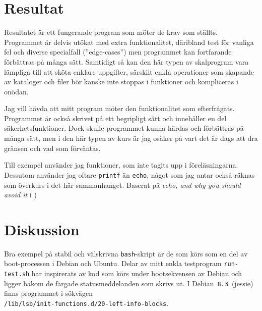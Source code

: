 %
%
%


\section{Resultat}
Resultatet är ett fungerande program som möter de krav som ställts.
Programmet är delvis utökat med extra funktionalitet, däribland test för vanliga
fel och diverse specialfall (''edge-cases'') men programmet kan fortfarande 
förbättras på många sätt. Samtidigt så kan den här typen av skalprogram vara
lämpliga till att sköta enklare uppgifter, särskilt enkla operationer som 
skapande av kataloger och filer bör kanske inte stoppas i funktioner och
kompliceras i onödan.

Jag vill hävda att mitt program möter den funktionalitet som efterfrågats.
Programmet är också skrivet på ett begripligt sätt och innehåller en del
säkerhetsfunktioner. Dock skulle programmet kunna härdas och förbättras på
många sätt, men i den här typen av kurs är jag osäker på vart det är dags 
att dra gränsen och vad som förväntas.

Till exempel använder jag funktioner, som inte tagits upp i föreläsningarna.
Dessutom använder jag oftare \texttt{printf} än \texttt{echo}, något som jag antar också
räknas som överkurs i det här sammanhanget. Baserat på \emph{echo, and why
you should avoid it} i \cite{Johnson:2015}) 


\section{Diskussion}
Bra exempel på stabil och välskrivna \texttt{bash}-skript är de som körs som en
del av boot-processen i Debian och Ubuntu. Delar av mitt enkla testprogram
\texttt{run-test.sh} har inspirerats av kod som körs under bootsekvensen av
Debian och ligger bakom de färgade statusmeddelanden som skrivs ut. I
\mbox{Debian \texttt{8.3} (jessie)} finns programmet i sökvägen \\
\smaller\texttt{/lib/lsb/init-functions.d/20-left-info-blocks}.

